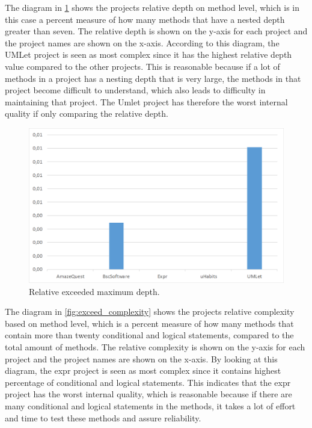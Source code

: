 \documentclass[conference]{IEEEtran}
\begin{document}
The diagram in \cref{fig:exceed_depth} shows the projects relative depth on method level, which is in this case a percent measure of how many methods that have a nested depth greater than seven. The relative depth is shown on the y-axis for each project and the project names are shown on the x-axis. According to this diagram, the UMLet project is seen as most complex since it   has the highest relative depth value compared to the other projects. This is reasonable because if a lot of methods in a project has a nesting depth that is very large, the methods in that project become difficult to understand, which also leads to difficulty in maintaining that project. The Umlet project has therefore the worst internal quality if only comparing the relative depth. 
\begin{figure}
    \includegraphics[width=\columnwidth]{img/rel_exceeded_depth.png}
\caption{Relative exceeded maximum depth.}
\label{fig:exceed_depth}
\end{figure}


The diagram in \cref{fig:exceed_complexity} shows the projects relative complexity based on method level, which is a percent measure of how many methods that contain more than twenty conditional and logical statements, compared to the total amount of methods. The relative complexity is shown on the y-axis for each project and the project names are shown on the x-axis. By looking at this diagram, the expr project is seen as most complex since it contains highest percentage of conditional and logical statements.  This indicates that the expr project has the worst internal quality, which is reasonable because if there are many conditional and logical statements in the methods, it takes a lot of effort and time to test these methods and assure reliability. 
\end{document}
